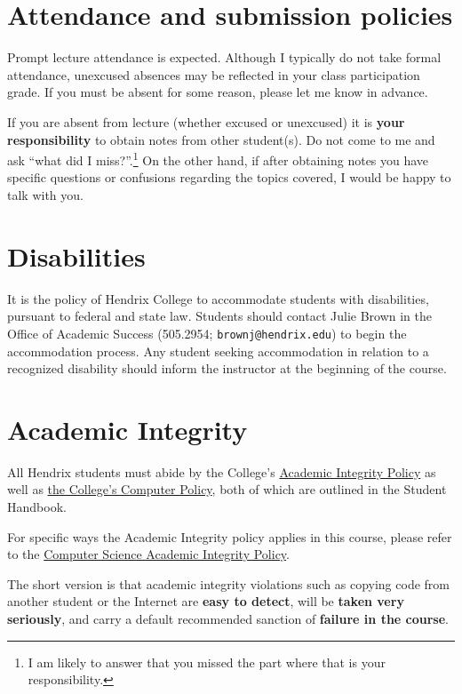 \documentclass{article}
\begin{document}
\section*{Attendance and submission policies}

Prompt lecture attendance is expected.  Although I typically do not
take formal attendance, unexcused absences may be reflected in your
class participation grade.  If you must be absent for some reason,
please let me know in advance.

If you are absent from lecture (whether excused or unexcused) it is
\textbf{your responsibility} to obtain notes from other student(s).
Do not come to me and ask ``what did I miss?''.\footnote{I am likely
  to answer that you missed the part where that is your
  responsibility.} On the other hand, if after obtaining notes you
have specific questions or confusions regarding the topics covered, I
would be happy to talk with you.

\section*{Disabilities}

It is the policy of Hendrix College to accommodate students with
disabilities, pursuant to federal and state law. Students should
contact Julie Brown in the Office of Academic Success (505.2954;
\texttt{brownj@hendrix.edu}) to begin the accommodation process. Any
student seeking accommodation in relation to a recognized disability
should inform the instructor at the beginning of the course.

\section*{Academic Integrity}

All Hendrix students must abide by the College's
\href{https://www.hendrix.edu/studentlife/handbook.aspx?id=67121}{Academic
Integrity Policy} as well as
\href{https://www.hendrix.edu/studentlife/handbook.aspx?id=42308}{the
College's Computer Policy}, both of which are outlined in the Student
Handbook.

For specific ways the Academic Integrity policy applies in this
course, please refer to the
\href{http://ozark.hendrix.edu/~yorgey/ac-integrity-policy.html}{Computer
  Science Academic Integrity Policy}.

The short version is that academic integrity violations such as
copying code from another student or the Internet are \textbf{easy to
  detect}, will be \textbf{taken
very seriously}, and carry a default recommended sanction of
\textbf{failure in the course}.
\end{document}
